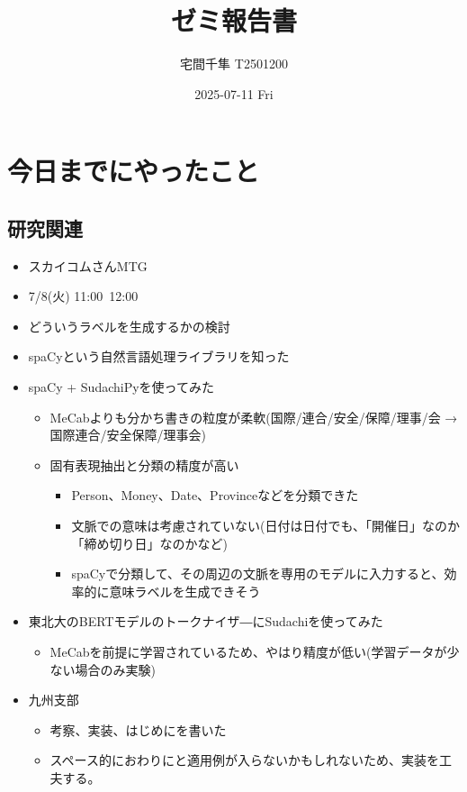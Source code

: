 \documentclass[uplatex, onecolumn, 10pt]{jsarticle}
\begin{document}
\title{\vspace{-40mm}\bf{\LARGE{ゼミ報告書}}}
\author{\vspace{-40mm}宅間千隼 T2501200}
\date{2025-07-11 Fri}
\maketitle


\section{今日までにやったこと}

\subsection*{研究関連} 
\begin{itemize}
	\item スカイコムさんMTG
	\item 7/8(火) 11:00~12:00
	\item どういうラベルを生成するかの検討
	\item spaCyという自然言語処理ライブラリを知った
\end{itemize}
\begin{itemize}
	\item spaCy + SudachiPyを使ってみた
	\begin{itemize}
	\item MeCabよりも分かち書きの粒度が柔軟(国際/連合/安全/保障/理事/会 → 国際連合/安全保障/理事会)
	\item 固有表現抽出と分類の精度が高い
	\begin{itemize}
		\item Person、Money、Date、Provinceなどを分類できた
		\item 文脈での意味は考慮されていない(日付は日付でも、「開催日」なのか「締め切り日」なのかなど)
		\item spaCyで分類して、その周辺の文脈を専用のモデルに入力すると、効率的に意味ラベルを生成できそう
	\end{itemize}
\end{itemize}
\item 東北大のBERTモデルのトークナイザ―にSudachiを使ってみた
\begin{itemize}
	\item MeCabを前提に学習されているため、やはり精度が低い(学習データが少ない場合のみ実験)
\end{itemize}
	\item 九州支部
	\begin{itemize}
	\item 考察、実装、はじめにを書いた
	\item スペース的におわりにと適用例が入らないかもしれないため、実装を工夫する。
	\end{itemize}
\end{itemize}
\end{document}
